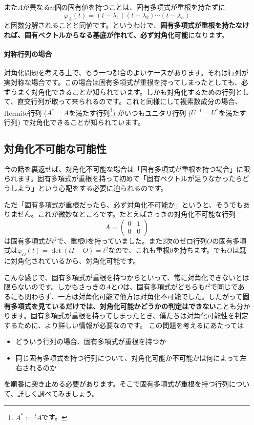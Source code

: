 また$A$が異なる$n$個の固有値を持つことは、固有多項式が重根を持たずに
\[
\varphi_A(t) = (t - \lambda_1)(t - \lambda_2) \cdots (t - \lambda_n)
\]
と因数分解されることと同値です。というわけで、\textbf{固有多項式が重根を持たなければ、固有ベクトルからなる基底が作れて、必ず対角化可能}になります。

\paragraph{対称行列の場合}

対角化問題を考える上で、もう一つ都合のよいケースがあります。それは行列が実対称な場合です。この場合は固有多項式が重根を持ってしまったとしても、必ずうまく対角化できることが知られています。しかも対角化するための行列として、直交行列が取って来られるのです。これと同様にして複素数成分の場合、Hermite行列 ($A^* = A$を満たす行列\footnote{$A^* := \overline{{}^t\!A}$です。}) がいつもユニタリ行列 ($U^{-1} = U^*$を満たす行列) で対角化できることが知られています。

\subsection{対角化不可能な可能性}

今の話を裏返せば、対角化不可能な場合は「固有多項式が重根を持つ場合」に限られます。固有多項式が重根を持って初めて「固有ベクトルが足りなかったらどうしよう」という心配をする必要に迫られるのです。

ただ「固有多項式が重根だったら、必ず対角化不可能か」というと、そうでもありません。これが微妙なところです。たとえばさっきの対角化不可能な行列
\[
A =
\begin{pmatrix}
0 & 1 \\
0 & 0
\end{pmatrix}
\]
は固有多項式が$t^2$で、重根$0$を持っていました。また$2$次のゼロ行列$O$の固有多項式は$\varphi_O(t) = \det(tI - O) = t^2$なので、これも重根$0$を持ちます。でも$O$は既に対角化されているから、対角化可能です。

こんな感じで、固有多項式が重根を持つからといって、常に対角化できないとは限らないのです。しかもさっきの$A$と$O$は、固有多項式がどちらも$t^2$で同じであるにも関わらず、一方は対角化可能で他方は対角化不可能でした。したがって\textbf{固有多項式を見ているだけでは、対角化可能かどうかの判定はできない}ことも分かります。固有多項式が重根を持ってしまったとき、僕たちは対角化可能性を判定するために、より詳しい情報が必要なのです。
この問題を考えるにあたっては
\begin{itemize}
\item どういう行列の場合、固有多項式が重根を持つか
\item 同じ固有多項式を持つ行列について、対角化可能か不可能かは何によって左右されるのか
\end{itemize}
を順番に突き止める必要があります。そこで固有多項式が重根を持つ行列について、詳しく調べてみましょう。


